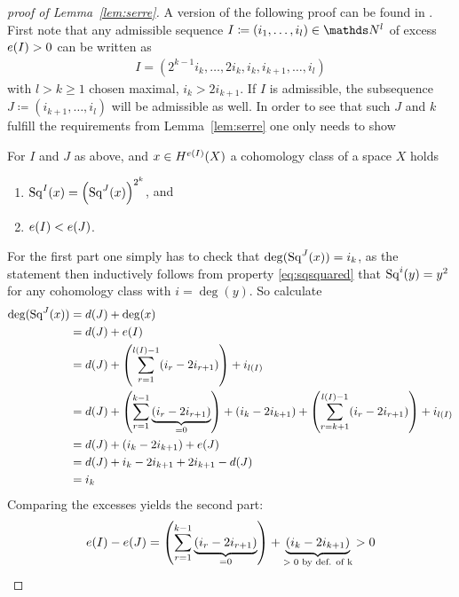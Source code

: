 \begin{proof}[proof of Lemma~\ref{lem:serre}]
  A version of the following proof can be found in
  \cite[p.~159, Lemma~1, converse part]{serre}.
  First note that any admissible sequence $I\coloneqq(i_1,\dotsc,i_l)\in\Nat^l$
  of excess $e(I)>0$ can be written as
  \begin{gather*}
    I=(2^{k-1}i_k,\dotsc,2i_k,i_k,i_{k+1},\dotsc,i_l)
  \end{gather*}
  with $l>k\geq 1$ chosen maximal, \idest $i_k>2i_{k+1}$. If $I$ is admissible, the subsequence
  $J\coloneqq(i_{k+1},\dotsc,i_l)$ will be admissible as well.
  In order to see that such $J$ and $k$ fulfill the requirements from
  Lemma~\ref{lem:serre} one only needs to show
  \begin{claim}
    For $I$ and $J$ as above, and $x\in H^{e(I)}(X)$ a cohomology
    class of a space $X$ holds
    \begin{enumerate}
    \item $\mathrm{Sq}^{I}(x) = \left(\mathrm{Sq}^{J}(x)\right)^{2^k}$, and
    \item $e(I)<e(J)$.
    \end{enumerate}
  \end{claim}
  For the first part one simply has to check that
  $\deg(\mathrm{Sq}^{J}(x))=i_k$, as the statement then inductively follows from
  property \eqref{eq:sqsquared} that $\mathrm{Sq}^{i}(y)=y^2$ for any cohomology
  class with $i=\deg(y)$.
  So calculate
  \begin{align*}
    \deg(\mathrm{Sq}^{J}(x))
    &= d(J) + \deg(x)\\
    &= d(J) + e(I)\\
    &= d(J) 
      + \left(\sum_{r=1}^{l(I)-1}(i_r-2i_{r+1})\right)
      + i_{l(I)}\\
    &= d(J)
      + \left(\sum_{r=1}^{k-1}\underbrace{(i_r-2i_{r+1})}_{=0}\right)
      + (i_k-2i_{k+1})
      +\left(\sum_{r=k+1}^{l(I)-1}(i_r-2i_{r+1})\right) + i_{l(I)}\\
    &= d(J)
      + (i_k-2i_{k+1})
      + e(J) \\
    &= d(J) + i_k - 2i_{k+1} + 2i_{k+1} - d(J) \\
    &= i_k
  \end{align*}
  Comparing the excesses yields the second part:
  \begin{gather*}
    e(I) - e(J)
    = \left(\sum_{r=1}^{k-1}\underbrace{(i_r-2i_{r+1})}_{=0}\right)
    + \underbrace{(i_k - 2i_{k+1})}_{\text{$>0$ by def. of k}}
    > 0
    \qedhere
  \end{gather*}
\end{proof}


